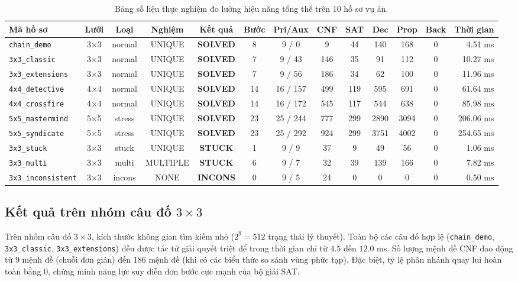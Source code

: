 \begin{table}[H]
\centering
\scriptsize
\setlength{\tabcolsep}{3.5pt}
\renewcommand{\arraystretch}{1.3}
\caption{Bảng số liệu thực nghiệm đo lường hiệu năng tổng thể trên 10 hồ sơ vụ án.}
\label{tab:benchmark-full}
\begin{tabular}{|l|c|c|c|c|c|c|c|c|c|c|c|r|}
\hline
\rowcolor{gray!15}
\textbf{Mã hồ sơ} & \textbf{Lưới} & \textbf{Loại} & \textbf{Nghiệm} & \textbf{Kết quả} & \textbf{Bước} & \textbf{Pri/Aux} & \textbf{CNF} & \textbf{SAT} & \textbf{Dec} & \textbf{Prop} & \textbf{Back} & \textbf{Thời gian} \\
\hline
\texttt{chain\_demo} & 3×3 & normal & UNIQUE & \textbf{SOLVED} & 8 & 9 / 0 & 9 & 44 & 140 & 168 & 0 & 4.51 ms \\
\hline
\texttt{3x3\_classic} & 3×3 & normal & UNIQUE & \textbf{SOLVED} & 7 & 9 / 43 & 146 & 35 & 91 & 112 & 0 & 10.27 ms \\
\hline
\texttt{3x3\_extensions} & 3×3 & normal & UNIQUE & \textbf{SOLVED} & 7 & 9 / 56 & 186 & 34 & 62 & 100 & 0 & 11.96 ms \\
\hline
\texttt{4x4\_detective} & 4×4 & normal & UNIQUE & \textbf{SOLVED} & 14 & 16 / 157 & 499 & 119 & 595 & 691 & 0 & 61.64 ms \\
\hline
\texttt{4x4\_crossfire} & 4×4 & normal & UNIQUE & \textbf{SOLVED} & 14 & 16 / 172 & 545 & 117 & 544 & 638 & 0 & 85.98 ms \\
\hline
\texttt{5x5\_mastermind} & 5×5 & stress & UNIQUE & \textbf{SOLVED} & 23 & 25 / 244 & 777 & 299 & 2890 & 3094 & 0 & 206.06 ms \\
\hline
\texttt{5x5\_syndicate} & 5×5 & stress & UNIQUE & \textbf{SOLVED} & 23 & 25 / 292 & 924 & 299 & 3751 & 4002 & 0 & 254.65 ms \\
\hline
\texttt{3x3\_stuck} & 3×3 & stuck & UNIQUE & \textbf{STUCK} & 1 & 9 / 9 & 37 & 9 & 49 & 56 & 0 & 1.06 ms \\
\hline
\texttt{3x3\_multi} & 3×3 & multi & MULTIPLE & \textbf{STUCK} & 6 & 9 / 7 & 32 & 39 & 139 & 166 & 0 & 7.82 ms \\
\hline
\texttt{3x3\_inconsistent} & 3×3 & incons & NONE & \textbf{INCONS} & 0 & 9 / 5 & 24 & 0 & 0 & 0 & 0 & 0.50 ms \\
\hline
\end{tabular}
\end{table}

\subsection{Kết quả trên nhóm câu đố $3 \times 3$}
\label{subsec:ket-qua-3x3}
Trên nhóm câu đố $3 \times 3$, kích thước không gian tìm kiếm nhỏ ($2^9 = 512$ trạng thái lý thuyết). Toàn bộ các câu đố hợp lệ (\texttt{chain\_demo}, \texttt{3x3\_classic}, \texttt{3x3\_extensions}) đều được tác tử giải quyết triệt để trong thời gian chỉ từ $4.5$ đến $12.0$ ms. Số lượng mệnh đề CNF dao động từ 9 mệnh đề (chuỗi đơn giản) đến 186 mệnh đề (khi có các biểu thức so sánh vùng phức tạp). Đặc biệt, tỷ lệ phân nhánh quay lui hoàn toàn bằng 0, chứng minh năng lực suy diễn đơn bước cực mạnh của bộ giải SAT.

